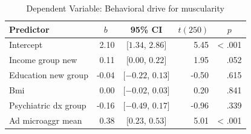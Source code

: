 \documentclass[
  english,
  man, fleqn, noextraspace,floatsintext]{apa6}
\begin{document}
\begin{table}[tbp]

\begin{center}
\begin{threeparttable}

\caption{\label{tab:regression-table}Dependent Variable: Behavioral drive for muscularity}

\begin{tabular}{lrcrr}
\toprule
Predictor & \multicolumn{1}{c}{$b$} & \multicolumn{1}{c}{95\% CI} & \multicolumn{1}{c}{$t(250)$} & \multicolumn{1}{c}{$p$}\\
\midrule
Intercept & 2.10 & $[1.34$, $2.86]$ & 5.45 & < .001\\
Income group new & 0.11 & $[0.00$, $0.22]$ & 1.95 & .052\\
Education new group & -0.04 & $[-0.22$, $0.13]$ & -0.50 & .615\\
Bmi & 0.00 & $[-0.02$, $0.03]$ & 0.20 & .841\\
Psychiatric dx group & -0.16 & $[-0.49$, $0.17]$ & -0.96 & .339\\
Ad microaggr mean & 0.38 & $[0.23$, $0.53]$ & 5.01 & < .001\\
\bottomrule
\end{tabular}

\end{threeparttable}
\end{center}

\end{table}
\end{document}
